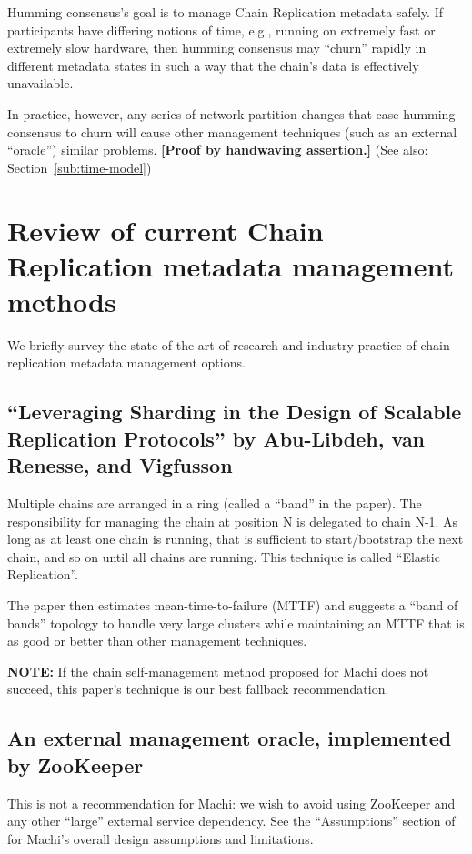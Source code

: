 \documentclass[preprint,10pt]{sigplanconf}
\begin{document}
Humming consensus's goal is to manage Chain Replication metadata
safely.  If participants have differing notions of time, e.g., running
on extremely fast or extremely slow hardware, then humming consensus
may ``churn'' rapidly in different metadata states in such a way that
the chain's data is effectively unavailable.  

In practice, however, any series of network partition changes that
case humming consensus to churn will cause other management techniques
(such as an external ``oracle'') similar problems.
{\bf [Proof by handwaving assertion.]}
(See also: Section~\ref{sub:time-model})

\section{Review of current Chain Replication metadata management methods}
\label{sec:cr-management-review}

We briefly survey the state of the art of research and industry
practice of chain replication metadata management options.

\subsection{``Leveraging Sharding in the Design of Scalable Replication Protocols'' by Abu-Libdeh, van Renesse, and Vigfusson}
\label{ssec:elastic-replication}
Multiple chains are arranged in a ring (called a ``band'' in the paper).
The responsibility for managing the chain at position N is delegated
to chain N-1.  As long as at least one chain is running, that is
sufficient to start/bootstrap the next chain, and so on until all
chains are running.  This technique is called ``Elastic Replication''.

The paper then estimates mean-time-to-failure
(MTTF) and suggests a ``band of bands'' topology to handle very large
clusters while maintaining an MTTF that is as good or better than
other management techniques.

{\bf NOTE:} If the chain self-management method proposed for Machi does not
succeed, this paper's technique is our best fallback recommendation.

\subsection{An external management oracle, implemented by ZooKeeper}
\label{ssec:an-oracle}
This is not a recommendation for Machi: we wish to avoid using
ZooKeeper and any other ``large'' external service dependency.  See
the ``Assumptions'' section of \cite{machi-design} for Machi's overall
design assumptions and limitations.
\end{document}
